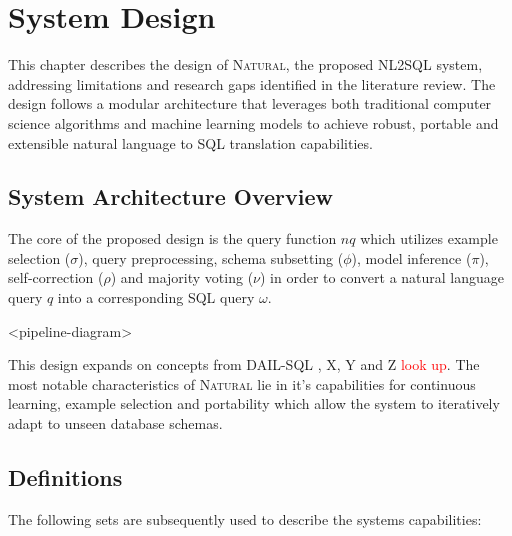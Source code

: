 


















\newpage

\section{System Design}

This chapter describes the design of \textsc{Natural}, the proposed NL2SQL system, 
addressing limitations and research gaps identified in the literature review.
The design follows a modular architecture that leverages both traditional computer
science algorithms and machine learning models to achieve robust, portable and
extensible natural language to SQL translation capabilities.

\subsection{System Architecture Overview}

The core of the proposed design is the query function $nq$ which utilizes
example selection ($\sigma$), query preprocessing, schema subsetting ($\phi$),
model inference ($\pi$), self-correction ($\rho$) and majority voting ($\nu$)
in order to convert a natural language query $q$ into a corresponding SQL query $\omega$.

<pipeline-diagram>
%

This design expands on concepts from DAIL-SQL \citep{DAIL}, X, Y and Z \textcolor{red}{look up}.
The most notable characteristics of \textsc{Natural} lie in it's capabilities for continuous
learning, example selection and portability which allow the system to iteratively
adapt to unseen database schemas.


\subsection{Definitions}

The following sets are subsequently used to describe the systems capabilities: 

